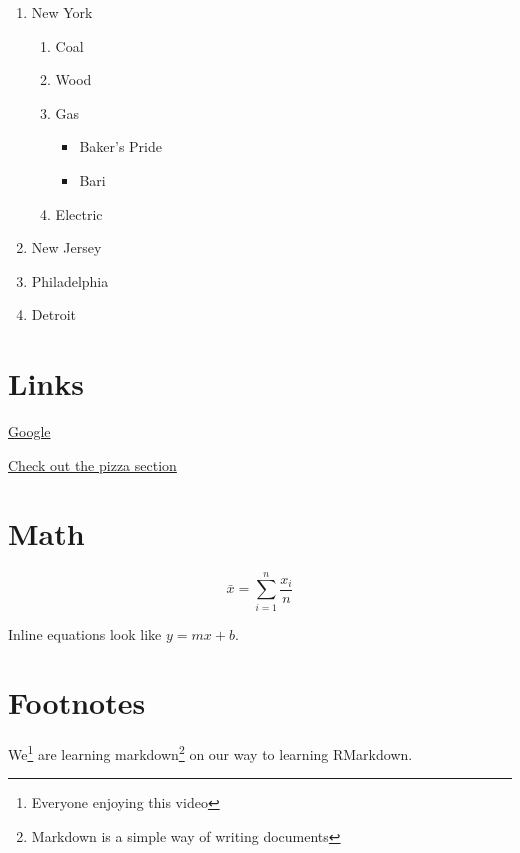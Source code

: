 \documentclass[
]{article}
\providecommand{\tightlist}{%
  \setlength{\itemsep}{0pt}\setlength{\parskip}{0pt}}
\begin{document}
\begin{enumerate}
\def\labelenumi{\arabic{enumi}.}
\tightlist
\item
  New York

  \begin{enumerate}
  \def\labelenumii{\alph{enumii}.}
  \tightlist
  \item
    Coal
  \item
    Wood
  \item
    Gas

    \begin{itemize}
    \tightlist
    \item
      Baker's Pride
    \item
      Bari
    \end{itemize}
  \item
    Electric
  \end{enumerate}
\item
  New Jersey
\item
  Philadelphia
\item
  Detroit
\end{enumerate}

\hypertarget{links}{%
\section{Links}\label{links}}

\href{www.google.com}{Google}

\protect\hyperlink{TheLists}{Check out the pizza section}

\hypertarget{math}{%
\section{Math}\label{math}}

\[
    \bar{x} = \sum_{i=1}^n \frac{x_i}{n}
\]

Inline equations look like \(y = mx + b\).

\hypertarget{footnotes}{%
\section{Footnotes}\label{footnotes}}

We\footnote{Everyone enjoying this video} are learning
markdown\footnote{Markdown is a simple way of writing documents} on our
way to learning RMarkdown.
\end{document}
